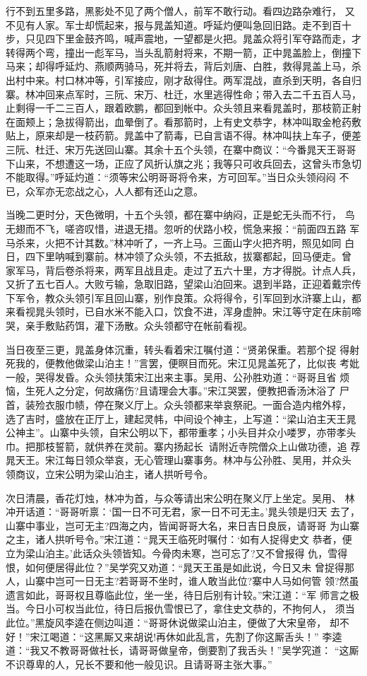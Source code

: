 行不到五里多路，黑影处不见了两个僧人，前军不敢行动。看四边路杂难行，
又不见有人家。军士却慌起来，报与晁盖知道。呼延灼便叫急回旧路。走不到百十
步，只见四下里金鼓齐鸣，喊声震地，一望都是火把。晁盖众将引军夺路而走，才
转得两个弯，撞出一彪军马，当头乱箭射将来，不期一箭，正中晁盖脸上，倒撞下
马来；却得呼延灼、燕顺两骑马，死并将去，背后刘唐、白胜，救得晁盖上马，杀
出村中来。村口林冲等，引军接应，刚才敌得住。两军混战，直杀到天明，各自归
寨。林冲回来点军时，三阮、宋万、杜迁，水里逃得性命；带入去二千五百人马，
止剩得一千二三百人，跟着欧鹏，都回到帐中。众头领且来看晁盖时，那枝箭正射
在面颊上；急拔得箭出，血晕倒了。看那箭时，上有史文恭字，林冲叫取金枪药敷
贴上，原来却是一枝药箭。晁盖中了箭毒，已自言语不得。林冲叫扶上车子，便差
三阮、杜迁、宋万先送回山寨。其余十五个头领，在寨中商议：“今番晁天王哥哥
下山来，不想遭这一场，正应了风折认旗之兆；我等只可收兵回去，这曾头市急切
不能取得。”呼延灼道：“须等宋公明哥哥将令来，方可回军。”当日众头领闷闷
不已，众军亦无恋战之心，人人都有还山之意。

当晚二更时分，天色微明，十五个头领，都在寨中纳闷，正是蛇无头而不行，
鸟无翅而不飞，嗟咨叹惜，进退无措。忽听的伏路小校，慌急来报：“前面四五路
军马杀来，火把不计其数。”林冲听了，一齐上马。三面山字火把齐明，照见如同
白日，四下里呐喊到寨前。林冲领了众头领，不去抵敌，拔寨都起，回马便走。曾
家军马，背后卷杀将来，两军且战且走。走过了五六十里，方才得脱。计点人兵，
又折了五七百人。大败亏输，急取旧路，望梁山泊回来。退到半路，正迎着戴宗传
下军令，教众头领引军且回山寨，别作良策。众将得令，引军回到水浒寨上山，都
来看视晁头领时，已自水米不能入口，饮食不进，浑身虚肿。宋江等守定在床前啼
哭，亲手敷贴药饵，灌下汤散。众头领都守在帐前看视。

当日夜至三更，晁盖身体沉重，转头看着宋江嘱付道：“贤弟保重。若那个捉
得射死我的，便教他做梁山泊主！”言罢，便瞑目而死。宋江见晁盖死了，比似丧
考妣一般，哭得发昏。众头领扶策宋江出来主事。吴用、公孙胜劝道：“哥哥且省
烦恼，生死人之分定，何故痛伤?且请理会大事。”宋江哭罢，便教把香汤沐浴了
尸首，装殓衣服巾帻，停在聚义厅上。众头领都来举哀祭祀。一面合造内棺外椁，
选了吉时，盛放在正厅上，建起灵帏，中间设个神主，上写道：“梁山泊主天王晁
公神主”。山寨中头领，自宋公明以下，都带重孝；小头目并众小喽罗，亦带孝头
巾。把那枝誓箭，就供养在灵前。寨内扬起长，请附近寺院僧众上山做功德，追
荐晁天王。宋江每日领众举哀，无心管理山寨事务。林冲与公孙胜、吴用，并众头
领商议，立宋公明为梁山泊主，诸人拱听号令。

次日清晨，香花灯烛，林冲为首，与众等请出宋公明在聚义厅上坐定。吴用、
林冲开话道：“哥哥听禀：‘国一日不可无君，家一日不可无主。’晁头领是归天
去了，山寨中事业，岂可无主?四海之内，皆闻哥哥大名，来日吉日良辰，请哥哥
为山寨之主，诸人拱听号令。”宋江道：“晁天王临死时嘱付：‘如有人捉得史文
恭者，便立为梁山泊主。’此话众头领皆知。今骨肉未寒，岂可忘了?又不曾报得
仇，雪得恨，如何便居得此位？”吴学究又劝道：“晁天王虽是如此说，今日又未
曾捉得那人，山寨中岂可一日无主?若哥哥不坐时，谁人敢当此位?寨中人马如何管
领?然虽遗言如此，哥哥权且尊临此位，坐一坐，待日后别有计较。”宋江道：“军
师言之极当。今日小可权当此位，待日后报仇雪恨已了，拿住史文恭的，不拘何人，
须当此位。”黑旋风李逵在侧边叫道：“哥哥休说做梁山泊主，便做了大宋皇帝，
却不好！”宋江喝道：“这黑厮又来胡说!再休如此乱言，先割了你这厮舌头！”
李逵道：“我又不教哥哥做社长，请哥哥做皇帝，倒要割了我舌头！”吴学究道：
“这厮不识尊卑的人，兄长不要和他一般见识。且请哥哥主张大事。”

